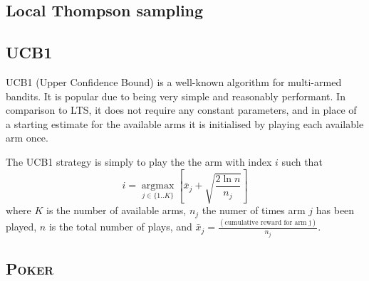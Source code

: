 \subsection{Local Thompson sampling}

\subsection{UCB1}

UCB1 (Upper Confidence Bound) is a well-known algorithm for multi-armed bandits.
It is popular due to being very simple and reasonably performant. In comparison 
to LTS, it does not require any constant parameters, and in place of a starting 
estimate for the available arms it is initialised by playing each available arm 
once.

The UCB1 strategy is simply to play the the arm with index $i$ such that
\begin{displaymath}
    i = \operatorname*{argmax}_{j \in \{ 1..K \}} \left[ \bar{x}_j + 
    \sqrt{\frac{2 \ln{n}}{n_j}} \right]
\end{displaymath}
where $K$ is the number of available arms, $n_j$ the numer of times arm $j$ has 
been played, $n$ is the total number of plays, and $\bar{x}_j 
=\frac{(\text{cumulative reward for arm j})}{n_j}$.

\subsection{\textsc{Poker}}

